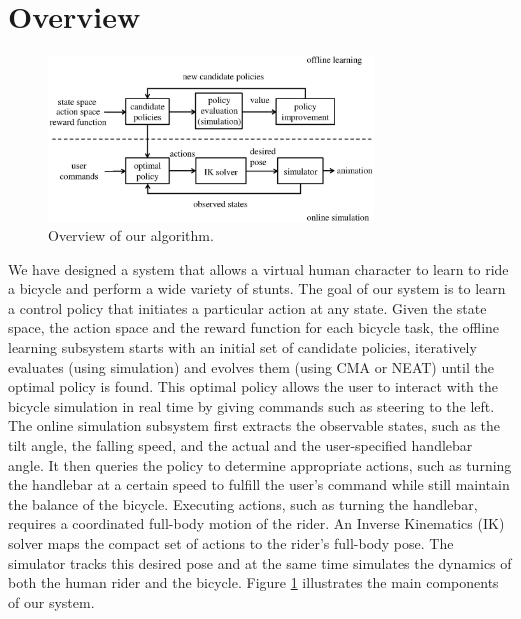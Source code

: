 \section{Overview}
\begin{figure}[!t]
  \centering
  \includegraphics[width=3.4in]{figures/overview}
  \caption{Overview of our algorithm.}
  \vspace{-0.1in}
  \label{fig:overview}
\end{figure}

We have designed a system that allows a virtual human character to learn to ride a bicycle and perform a wide variety of stunts. The goal of our system is to learn a control policy that initiates a particular action at any state. Given the state space, the action space and the reward function for each bicycle task, the offline learning subsystem starts with an initial set of candidate policies, iteratively evaluates (using simulation) and evolves them (using CMA or NEAT) until the optimal policy is found. This optimal policy allows the user to interact with the bicycle simulation in real time by giving commands such as steering to the left. The online simulation subsystem first extracts the observable states, such as the tilt angle, the falling speed, and the actual and the user-specified handlebar angle. It then queries the policy to determine appropriate actions, such as turning the handlebar at a certain speed to fulfill the user's command while still maintain the balance of the bicycle. Executing actions, such as turning the handlebar, requires a coordinated full-body motion of the rider. An Inverse Kinematics (IK) solver maps the compact set of actions to the rider's full-body pose. The simulator tracks this desired pose and at the same time simulates the dynamics of both the human rider and the bicycle. Figure \ref{fig:overview} illustrates the main components of our system.

